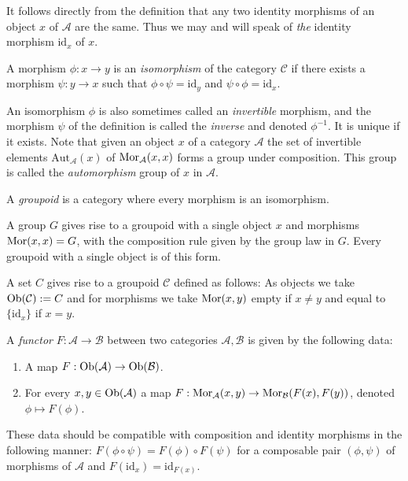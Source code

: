 \begin{remark}
\label{remark-unique-identity}
It follows directly from the definition that any two identity morphisms
of an object $x$ of $\mathcal{A}$ are the same. Thus we may and will
speak of {\it the} identity morphism $\text{id}_x$ of $x$.
\end{remark}

\begin{definition}
\label{definition-isomorphism}
A morphism $\phi : x \to y$ is an {\it isomorphism} of the category
$\mathcal{C}$ if there exists a morphism $\psi : y \to x$
such that $\phi \circ \psi = \text{id}_y$ and
$\psi \circ \phi = \text{id}_x$.
\end{definition}

\noindent
An isomorphism $\phi$ is also sometimes called an {\it invertible}
morphism, and the morphism $\psi$ of the definition is called the
{\it inverse} and denoted $\phi^{-1}$. It is unique if it exists. Note that
given an object $x$ of a category $\mathcal{A}$ the set of invertible
elements $\text{Aut}_\mathcal{A}(x)$
of $\mathop{\mathrm{Mor}}\nolimits_\mathcal{A}(x, x)$ forms a group under composition.
This group is called the {\it automorphism} group of $x$ in $\mathcal{A}$.

\begin{definition}
\label{definition-groupoid}
A {\it groupoid} is a category where every morphism is an isomorphism.
\end{definition}

\begin{example}
\label{example-group-groupoid}
A group $G$ gives rise to a groupoid with a single object $x$
and morphisms $\mathop{\mathrm{Mor}}\nolimits(x, x) = G$, with the composition rule
given by the group law in $G$. Every groupoid with a single
object is of this form.
\end{example}

\begin{example}
\label{example-set-groupoid}
A set $C$ gives rise to a groupoid $\mathcal{C}$ defined as follows:
As objects we take $\mathop{\mathrm{Ob}}\nolimits(\mathcal{C}) := C$ and for morphisms
we take $\mathop{\mathrm{Mor}}\nolimits(x, y)$ empty if $x\neq y$ and equal to
$\{\text{id}_x\}$ if $x = y$.
\end{example}

\begin{definition}
\label{definition-functor}
A {\it functor} $F : \mathcal{A} \to \mathcal{B}$
between two categories $\mathcal{A}, \mathcal{B}$ is given by the
following data:
\begin{enumerate}
\item A map $F : \mathop{\mathrm{Ob}}\nolimits(\mathcal{A}) \to \mathop{\mathrm{Ob}}\nolimits(\mathcal{B})$.
\item For every $x, y \in \mathop{\mathrm{Ob}}\nolimits(\mathcal{A})$ a map
$F : \mathop{\mathrm{Mor}}\nolimits_\mathcal{A}(x, y) \to \mathop{\mathrm{Mor}}\nolimits_\mathcal{B}(F(x), F(y))$,
denoted $\phi \mapsto F(\phi)$.
\end{enumerate}
These data should be compatible with composition and identity morphisms
in the following manner: $F(\phi \circ \psi) =
F(\phi) \circ F(\psi)$ for a composable pair $(\phi, \psi)$ of
morphisms of $\mathcal{A}$ and $F(\text{id}_x) = \text{id}_{F(x)}$.
\end{definition}

